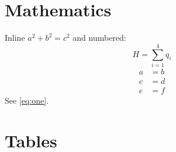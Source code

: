 \documentclass{article}
\begin{document}
\section{Mathematics}
Inline $a^2+b^2=c^2$ and numbered:
\begin{equation}\label{eq:one}
H = \sum_{i=1}^{4} q_i
\end{equation}
\begin{align}
a &= b \\
c &= d \nonumber \\
e &= f \tag{A}
\end{align}
See \eqref{eq:one}.

\section{Tables}
\begin{table}
\caption{Witnesses}\label{tab:w}
\end{table}
\end{document}
